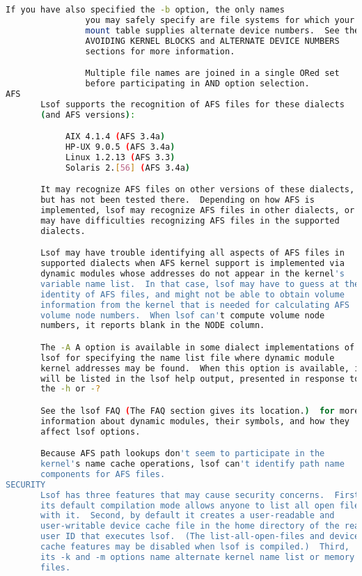 {{\begin{lstlisting}[language=bash]
                If you have also specified the -b option, the only names
                you may safely specify are file systems for which your
                mount table supplies alternate device numbers.  See the
                AVOIDING KERNEL BLOCKS and ALTERNATE DEVICE NUMBERS
                sections for more information.

                Multiple file names are joined in a single ORed set
                before participating in AND option selection.
AFS
       Lsof supports the recognition of AFS files for these dialects
       (and AFS versions):

            AIX 4.1.4 (AFS 3.4a)
            HP-UX 9.0.5 (AFS 3.4a)
            Linux 1.2.13 (AFS 3.3)
            Solaris 2.[56] (AFS 3.4a)

       It may recognize AFS files on other versions of these dialects,
       but has not been tested there.  Depending on how AFS is
       implemented, lsof may recognize AFS files in other dialects, or
       may have difficulties recognizing AFS files in the supported
       dialects.

       Lsof may have trouble identifying all aspects of AFS files in
       supported dialects when AFS kernel support is implemented via
       dynamic modules whose addresses do not appear in the kernel's
       variable name list.  In that case, lsof may have to guess at the
       identity of AFS files, and might not be able to obtain volume
       information from the kernel that is needed for calculating AFS
       volume node numbers.  When lsof can't compute volume node
       numbers, it reports blank in the NODE column.

       The -A A option is available in some dialect implementations of
       lsof for specifying the name list file where dynamic module
       kernel addresses may be found.  When this option is available, it
       will be listed in the lsof help output, presented in response to
       the -h or -?

       See the lsof FAQ (The FAQ section gives its location.)  for more
       information about dynamic modules, their symbols, and how they
       affect lsof options.

       Because AFS path lookups don't seem to participate in the
       kernel's name cache operations, lsof can't identify path name
       components for AFS files.
SECURITY
       Lsof has three features that may cause security concerns.  First,
       its default compilation mode allows anyone to list all open files
       with it.  Second, by default it creates a user-readable and
       user-writable device cache file in the home directory of the real
       user ID that executes lsof.  (The list-all-open-files and device
       cache features may be disabled when lsof is compiled.)  Third,
       its -k and -m options name alternate kernel name list or memory
       files.


\end{lstlisting}}}
